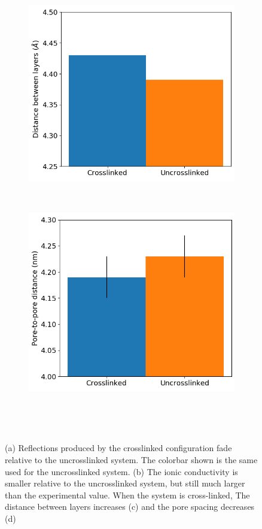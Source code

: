 \documentclass{article}
\begin{document}
\begin{figure}
\begin{subfigure}{0.45\textwidth}
	\includegraphics[width=\textwidth]{dbwl_xlink.png}
	\caption{}~\label{fig:dbwl_xlink}
  \end{subfigure}
  \begin{subfigure}{0.45\textwidth}
	\centering
	\includegraphics[width=\textwidth]{p2p_xlink.png}
	\caption{}~\label{fig:p2p_xlink}
  \end{subfigure}
  \caption{(a) Reflections produced by the crosslinked configuration fade
	  relative to the uncrosslinked system. The colorbar shown is the same used for
	  the uncrosslinked system. (b) The ionic conductivity is smaller relative to the
	  uncrosslinked system, but still much larger than the experimental value. When
	  the system is cross-linked, The distance between layers increases (c) and the
	  pore spacing decreases (d)}~\label{fig:xlink}
  \end{figure}
 
\end{document}
